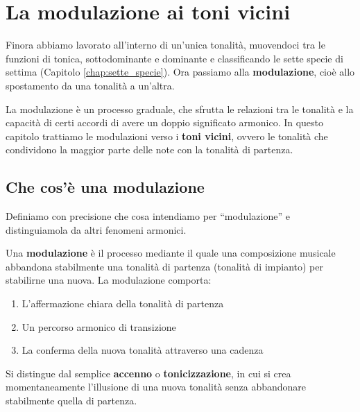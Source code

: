 \chapter{La modulazione ai toni vicini}
\label{chap:modulazione}

Finora abbiamo lavorato all'interno di un'unica tonalità, muovendoci tra le funzioni di tonica, sottodominante e dominante e classificando le sette specie di settima (Capitolo \ref{chap:sette_specie}). Ora passiamo alla \textbf{modulazione}, cioè allo spostamento da una tonalità a un'altra.

La modulazione è un processo graduale, che sfrutta le relazioni tra le tonalità e la capacità di certi accordi di avere un doppio significato armonico. In questo capitolo trattiamo le modulazioni verso i \textbf{toni vicini}, ovvero le tonalità che condividono la maggior parte delle note con la tonalità di partenza.

\section{Che cos'è una modulazione}
\label{sec:definizione_modulazione}

Definiamo con precisione che cosa intendiamo per ``modulazione'' e distinguiamola da altri fenomeni armonici.

\begin{definizione}[Modulazione]
	\label{def:modulazione}
	Una \textbf{modulazione} è il processo mediante il quale una composizione musicale abbandona stabilmente una tonalità di partenza (tonalità di impianto) per stabilirne una nuova. La modulazione comporta:
	\begin{enumerate}
		\item L'affermazione chiara della tonalità di partenza
		\item Un percorso armonico di transizione
		\item La conferma della nuova tonalità attraverso una cadenza
	\end{enumerate}
	
	Si distingue dal semplice \textbf{accenno} o \textbf{tonicizzazione}, in cui si crea momentaneamente l'illusione di una nuova tonalità senza abbandonare stabilmente quella di partenza.
\end{definizione}

